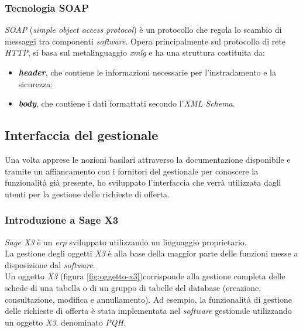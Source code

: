 \vspace{10pt}

\subsubsection{Tecnologia SOAP}
\textit{SOAP} (\textit{simple object access protocol}) è un protocollo che regola lo scambio di messaggi tra componenti \textit{software}. Opera principalmente sul protocollo di rete \textit{HTTP}, si basa sul metalinguaggio \textit{\gls{xmlg}\glsfirstoccur} e ha una struttura costituita da:
\begin{itemize}
	\item \textit{\textbf{header}}, che contiene le informazioni necessarie per l'instradamento e la sicurezza; 
	\item \textit{\textbf{body}}, che contiene i dati formattati secondo l'\textit{XML Schema}.
\end{itemize}



\vspace{15pt}

\subsection{Interfaccia del gestionale}
\label{cap:architettura-sage}
Una volta apprese le nozioni basilari attraverso la documentazione disponibile e tramite un affiancamento con i fornitori del gestionale per conoscere la funzionalità già
presente, ho sviluppato l'interfaccia che verrà utilizzata dagli utenti per la gestione delle richieste di offerta.

\subsubsection{Introduzione a Sage X3}
\textit{Sage X3} è un \textit{\gls{erp}\glsfirstoccur} sviluppato utilizzando un linguaggio proprietario.\\
La gestione degli oggetti\textit{ X3} è alla base della maggior parte delle funzioni messe a disposizione dal \textit{software}.\\
Un oggetto\textit{ X3} (figura \ref{fig:oggetto-x3})corrisponde alla gestione completa delle schede di una tabella o di un gruppo di tabelle del database (creazione, consultazione, modifica e annullamento).
Ad esempio, la funzionalità di gestione delle richieste di offerta è stata implementata nel \textit{software} gestionale utilizzando un oggetto\textit{ X3}, denominato \textit{PQH}.

